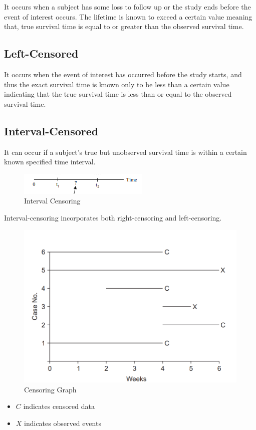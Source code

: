 \documentclass[doublespacing]{report} %
\begin{document}
It occurs when a subject has some loss to follow up or the study ends before the event of interest occurs. The lifetime is known to exceed a certain value meaning that, true survival time is equal to or greater than the observed survival time.

\subsection{Left-Censored}

It occurs when the event of interest has occurred before the study starts, and thus the exact survival time is known only to be less than a certain value indicating that the true survival time is less than or equal to the observed survival time.

\subsection{Interval-Censored}
It can occur if a subject’s true but unobserved survival time is within a certain known specified time interval. 
\begin{figure}[H]
    \centering
    \includegraphics[width=0.4\linewidth]{Figure 3/3.1.png}
    \caption{Interval Censoring}
    \label{Figure 3.1}
\end{figure}

Interval-censoring incorporates both right-censoring and left-censoring. 

\begin{figure}[H]
    \centering
    \includegraphics[width=0.5\linewidth]{Figure 3/3.2.png}
    \caption{Censoring Graph}
    \label{Figure 3.2}
\end{figure}


\begin{itemize}

\item \(C\) indicates censored data
\item  \(X\) indicates observed events


\end{itemize}
\end{document}
